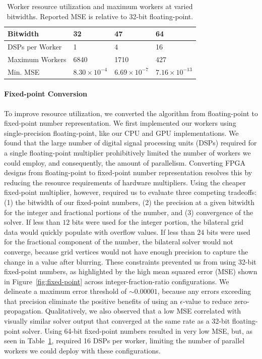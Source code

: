   \begin{table}[h]
		\centering
		\caption{Worker resource utilization and maximum workers at varied bitwidths. Reported MSE is relative to 32-bit floating-point.}

		\begin{tabular}{l|lll}
		\toprule
		Bitwidth        & 32                   & 47                    & 64                   \\ \midrule
		DSPs per Worker & 1                    & 4                     & 16                   \\
		Maximum Workers & 6840                  & 1710                    & 427                   \\
		Min. MSE        & $8.30\times 10^{-4}$ &  $6.69\times 10^{-7}$  & $7.16\times 10^{-13}$ \\ \bottomrule
		\end{tabular}
		\label{table:dsp-workers}


  \end{table}


\paragraph{Fixed-point Conversion} To improve resource utilization, we converted the algorithm from floating-point to fixed-point number representation.
We first implemented our workers using single-precision floating-point, like our CPU and GPU implementations.
We found that the large number of digital signal processing units (DSPs) required for a single floating-point multiplier prohibitively limited the number of workers we could employ, and consequently, the amount of parallelism.
Converting FPGA designs from floating-point to fixed-point number representation resolves this by reducing the resource requirements of hardware multipliers.
Using the cheaper fixed-point multiplier, however, required us to evaluate three competing tradeoffs: (1) the bitwidth of our fixed-point numbers, (2) the precision at a given bitwidth for the integer and fractional portions of the number, and (3) convergence of the solver.
If less than $12$ bits were used for the integer portion, the bilateral grid data would quickly populate with overflow values.
If less than $24$ bits were used for the fractional component of the number, the bilateral solver would not converge, because grid vertices would not have enough precision to capture the change in a value after blurring.
These constraints prevented us from using 32-bit fixed-point numbers, as highlighted by the high mean squared error (MSE) shown in Figure~\ref{fig:fixed-point} across integer-fraction-ratio configurations.
We delineate a maximum error threshold of $\sim 0.00001$, because any errors exceeding that precision eliminate the positive benefits of using an $\epsilon$-value to reduce zero-propagation.
Qualitatively, we also observed that a low MSE correlated with visually similar solver output that converged at the same rate as a 32-bit floating-point solver.
Using 64-bit fixed-point numbers resulted in very low MSE, but, as seen in Table~\ref{table:dsp-workers}, required 16 DSPs per worker, limiting the number of parallel workers we could deploy with these configurations.

